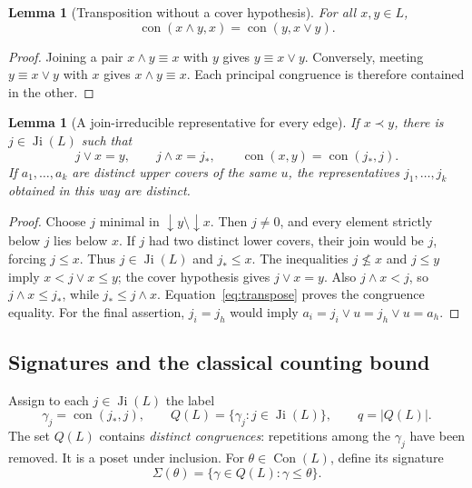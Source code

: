 \documentclass[11pt,a4paper]{article}
\numberwithin{equation}{section}
\newtheorem{lemma}[theorem]{Lemma}
\theoremstyle{definition}
\theoremstyle{remark}
\DeclareMathOperator{\Con}{Con}
\DeclareMathOperator{\con}{con}
\DeclareMathOperator{\Ji}{Ji}
\newcommand{\card}[1]{\lvert #1\rvert}
\begin{document}
\begin{lemma}[Transposition without a cover hypothesis]\label{lem:transpose}
For all $x,y\in L$,
\begin{equation}\label{eq:transpose}
 \con(x\wedge y,x)=\con(y,x\vee y).
\end{equation}
\end{lemma}
\begin{proof}
Joining a pair $x\wedge y\equiv x$ with $y$ gives $y\equiv x\vee y$.
Conversely, meeting $y\equiv x\vee y$ with $x$ gives $x\wedge y\equiv x$.
Each principal congruence is therefore contained in the other.
\end{proof}

\begin{lemma}[A join-irreducible representative for every edge]\label{lem:representative}
If $x\prec y$, there is $j\in\Ji(L)$ such that
\begin{equation}\label{eq:representative}
 j\vee x=y,\qquad j\wedge x=j_*,\qquad
 \con(x,y)=\con(j_*,j).
\end{equation}
If $a_1,\ldots,a_k$ are distinct upper covers of the same $u$, the representatives
$j_1,\ldots,j_k$ obtained in this way are distinct.
\end{lemma}
\begin{proof}
Choose $j$ minimal in $\downarrow y\setminus\downarrow x$.
Then $j\ne0$, and every element strictly below $j$ lies below $x$.
If $j$ had two distinct lower covers, their join would be $j$, forcing $j\le x$.
Thus $j\in\Ji(L)$ and $j_*\le x$.
The inequalities $j\nleq x$ and $j\le y$ imply $x<j\vee x\le y$;
the cover hypothesis gives $j\vee x=y$.
Also $j\wedge x<j$, so $j\wedge x\le j_*$, while $j_*\le j\wedge x$.
Equation~\eqref{eq:transpose} proves the congruence equality.
For the final assertion, $j_i=j_h$ would imply
$a_i=j_i\vee u=j_h\vee u=a_h$.
\end{proof}

\subsection{Signatures and the classical counting bound}
Assign to each $j\in\Ji(L)$ the label
\begin{equation}\label{eq:labels}
 \gamma_j=\con(j_*,j),\qquad
 Q(L)=\{\gamma_j:j\in\Ji(L)\},\qquad q=\card{Q(L)}.
\end{equation}
The set $Q(L)$ contains \emph{distinct congruences}: repetitions among the
$\gamma_j$ have been removed. It is a poset under inclusion.
For $\theta\in\Con(L)$, define its signature
\begin{equation}\label{eq:signature}
 \Sigma(\theta)=\{\gamma\in Q(L):\gamma\le\theta\}.
\end{equation}
\end{document}
